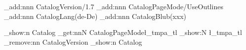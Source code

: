 \documentclass{article}
\begin{document}
\ExplSyntaxOn
\pdfmanagement_add:nnn   {Catalog}{Version}{/1.7}
\pdfmanagement_add:nnn   {Catalog}{PageMode}{/UseOutlines}
\pdfmanagement_add:nnn   {Catalog}{Lang}{(de-De)}
\pdfmanagement_add:nnn   {Catalog}{Blub}{(xxx)}

\pdfmanagement_show:n    {Catalog}
\pdfmanagement_get:nnN   {Catalog}{PageMode}\l_tmpa_tl
\tl_show:N \l_tmpa_tl
\pdfmanagement_remove:nn {Catalog}{Version}
\pdfmanagement_show:n    {Catalog}
\ExplSyntaxOff
\end{document}
